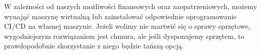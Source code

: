 W zależności od naszych możliwości finansowych oraz zaopatrzeniowych, możemy wynająć maszynę wirtualną
lub zainstalować odpowiednie oprogramowanie CI/CD na własnej maszynie. 
Jeżeli wolimy nie martwić się o sprawy sprzętowe, wygodniejszym rozwiązaniem jest chmura,
ale jeśli dysponujemy sprzętem, to prawdopodobnie skorzystanie z niego będzie tańszą opcją. 

